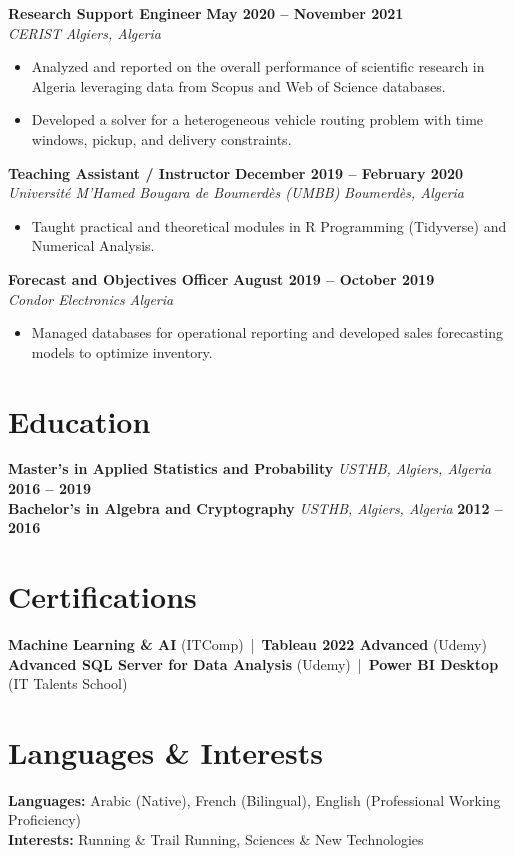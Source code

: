 \documentclass[11pt,letterpaper]{article}
\begin{document}
\noindent
\textbf{Research Support Engineer} \hfill \textbf{May 2020 -- November 2021} \\
\textit{CERIST} \hfill \textit{Algiers, Algeria}
\begin{itemize}[leftmargin=0.2in, itemsep=-2pt, topsep=2pt]
    \item Analyzed and reported on the overall performance of scientific research in Algeria leveraging data from Scopus and Web of Science databases.
    \item Developed a solver for a heterogeneous vehicle routing problem with time windows, pickup, and delivery constraints. 
\end{itemize}

\noindent
\textbf{Teaching Assistant / Instructor} \hfill \textbf{December 2019 -- February 2020} \\
\textit{Université M'Hamed Bougara de Boumerdès (UMBB)} \hfill \textit{Boumerdès, Algeria}
\begin{itemize}[leftmargin=0.2in, itemsep=-2pt, topsep=2pt]
    \item Taught practical and theoretical modules in R Programming (Tidyverse) and Numerical Analysis.
\end{itemize}

\noindent
\textbf{Forecast and Objectives Officer} \hfill \textbf{August 2019 -- October 2019} \\
\textit{Condor Electronics} \hfill \textit{Algeria}
\begin{itemize}[leftmargin=0.2in, itemsep=-2pt, topsep=2pt]
    \item Managed databases for operational reporting and developed sales forecasting models to optimize inventory.
\end{itemize}

\section*{Education}
\noindent
\textbf{Master's in Applied Statistics and Probability} \textbar{} \textit{USTHB, Algiers, Algeria} \hfill \textbf{2016 -- 2019} \\
\textbf{Bachelor's in Algebra and Cryptography} \textbar{} \textit{USTHB, Algiers, Algeria} \hfill \textbf{2012 -- 2016}

\section*{Certifications}
\noindent
\textbf{Machine Learning \& AI} (ITComp) \,|\, \textbf{Tableau 2022 Advanced} (Udemy) \\
\textbf{Advanced SQL Server for Data Analysis} (Udemy) \,|\, \textbf{Power BI Desktop} (IT Talents School)

\section*{Languages \& Interests}
\noindent
\textbf{Languages:} Arabic (Native), French (Bilingual), English (Professional Working Proficiency) \\
\textbf{Interests:} Running \& Trail Running, Sciences \& New Technologies
\end{document}
